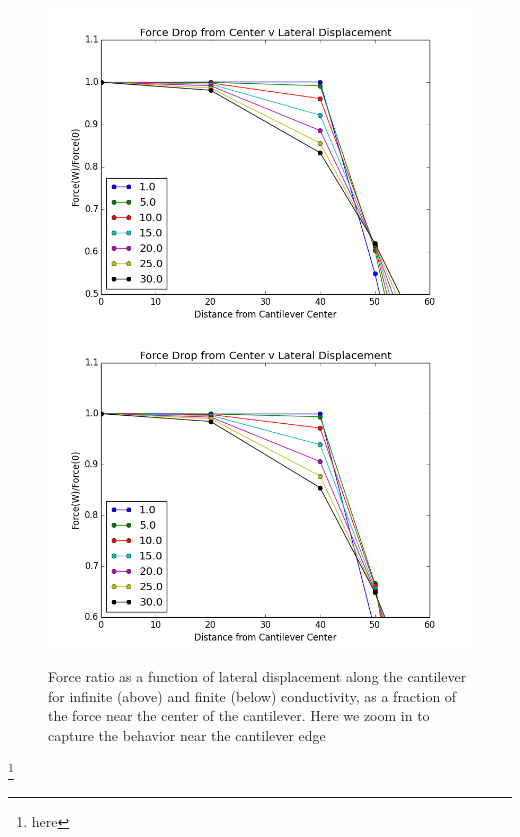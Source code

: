 \documentclass[11pt,traditabstract]{article}
\begin{document}
\begin{figure}[h]
\centering
\includegraphics[width=5in]{lateral_force_drop_zoom}
\includegraphics[width=5in]{lateral_force_drop_finite_zoom}
\caption{Force ratio as a function of lateral displacement along the cantilever for infinite (above) and finite (below) conductivity, as a fraction of the force near the center of the cantilever. Here we zoom in to capture the behavior near the cantilever edge}\label{fig:latdropZoom}
\end{figure}

\clearpage


\thanks{here}
\end{document}
